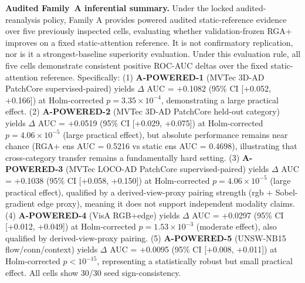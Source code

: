 \documentclass[10pt,conference]{IEEEtran}
\begin{document}


\noindent\textbf{Audited Family~A inferential summary.}
Under the locked audited-reanalysis policy, Family A provides powered audited static-reference evidence over five previously inspected cells, evaluating whether validation-frozen RGA+ improves on a fixed static-attention reference. It is not confirmatory replication, nor is it a strongest-baseline superiority evaluation. Under this evaluation rule, all five cells demonstrate consistent positive ROC-AUC deltas over the fixed static-attention reference. Specifically:
(1) \textbf{A-POWERED-1} (MVTec 3D-AD PatchCore supervised-paired) yields $\Delta$ AUC = +0.1082 (95\% CI [+0.052, +0.166]) at Holm-corrected $p = 3.35\times 10^{-4}$, demonstrating a large practical effect.
(2) \textbf{A-POWERED-2} (MVTec 3D-AD PatchCore held-out category) yields $\Delta$ AUC = +0.0519 (95\% CI [+0.029, +0.075]) at Holm-corrected $p = 4.06\times 10^{-5}$ (large practical effect), but absolute performance remains near chance (RGA+ ens AUC = 0.5216 vs static ens AUC = 0.4698), illustrating that cross-category transfer remains a fundamentally hard setting.
(3) \textbf{A-POWERED-3} (MVTec LOCO-AD PatchCore supervised-paired) yields $\Delta$ AUC = +0.1038 (95\% CI [+0.058, +0.150]) at Holm-corrected $p = 4.06\times 10^{-5}$ (large practical effect), qualified by a derived-view-proxy pairing strength (rgb + Sobel-gradient edge proxy), meaning it does not support independent modality claims.
(4) \textbf{A-POWERED-4} (VisA RGB+edge) yields $\Delta$ AUC = +0.0297 (95\% CI [+0.012, +0.049]) at Holm-corrected $p = 1.53\times 10^{-3}$ (moderate effect), also qualified by derived-view-proxy pairing.
(5) \textbf{A-POWERED-5} (UNSW-NB15 flow/conn/context) yields $\Delta$ AUC = +0.0095 (95\% CI [+0.008, +0.011]) at Holm-corrected $p < 10^{-15}$, representing a statistically robust but small practical effect.
All cells show 30/30 seed sign-consistency.
\end{document}
